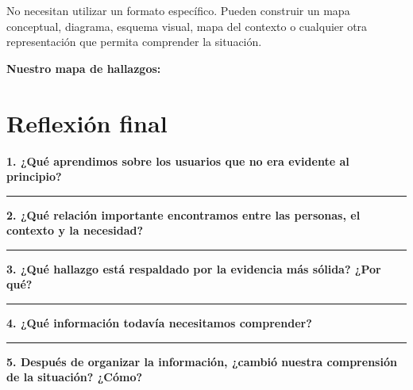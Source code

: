 \documentclass[12pt,a4paper]{article}
\begin{document}
	No necesitan utilizar un formato específico. Pueden construir un mapa conceptual, diagrama, esquema visual, mapa del contexto o cualquier otra representación que permita comprender la situación.
	
	\textbf{Nuestro mapa de hallazgos:}
	
	\vspace{0.2cm}
	
	\begin{center}
		\fbox{\rule{0pt}{2cm}\rule{0.84\linewidth}{0pt}}
	\end{center}
	
	\section*{Reflexión final}
	
	\textbf{1. ¿Qué aprendimos sobre los usuarios que no era evidente al principio?}
	
	\vspace{0.35cm}
	
	\rule{\linewidth}{0.4pt}
	
	\vspace{0.4cm}
	
	\textbf{2. ¿Qué relación importante encontramos entre las personas, el contexto y la necesidad?}
	
	\vspace{0.35cm}
	
	\rule{\linewidth}{0.4pt}
	
	\vspace{0.4cm}
	
	\textbf{3. ¿Qué hallazgo está respaldado por la evidencia más sólida? ¿Por qué?}
	
	\vspace{0.35cm}
	
	\rule{\linewidth}{0.4pt}
	
	\vspace{0.4cm}
	
	\textbf{4. ¿Qué información todavía necesitamos comprender?}
	
	\vspace{0.35cm}
	
	\rule{\linewidth}{0.4pt}
	
	\vspace{0.4cm}
	
	\textbf{5. Después de organizar la información, ¿cambió nuestra comprensión de la situación? ¿Cómo?}
	
	\vspace{0.35cm}
	
\end{document}

